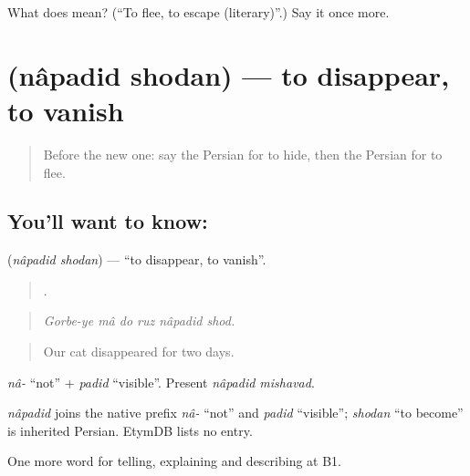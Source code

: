 \begin{tcolorbox}[breakable,colback=teal!4,colframe=teal!35!black,title={Before you move on}]
What does  mean? (\textquotedblleft{}To flee, to escape (literary)\textquotedblright{}.) Say it once more.
\end{tcolorbox}
\section[\texorpdfstring{\fa{ناپدید} \fa{شدن} (nâpadid shodan)}{ناپدید شدن (nâpadid shodan)}]{  (nâpadid shodan) — to disappear, to vanish}

\label{lesson:FA-C317-napadid-shodan}



\begin{quote}
Before the new one: say the Persian for to hide, then the Persian for to flee.
\end{quote}

\subsection*{You'll want to know:  }
\textbf{ } (\emph{nâpadid shodan}) — \textquotedblleft{}to disappear, to vanish\textquotedblright{}.

\begin{quote}
     .
\end{quote}

\begin{quote}
\emph{Gorbe-ye mâ do ruz nâpadid shod.}
\end{quote}

\begin{quote}
Our cat disappeared for two days.
\end{quote}

\emph{nâ-} \textquotedblleft{}not\textquotedblright{} + \emph{padid} \textquotedblleft{}visible\textquotedblright{}. Present \emph{nâpadid mishavad}.

\begin{cousinweb}
\emph{nâpadid} joins the native prefix \emph{nâ-} \textquotedblleft{}not\textquotedblright{} and \emph{padid} \textquotedblleft{}visible\textquotedblright{}; \emph{shodan} \textquotedblleft{}to become\textquotedblright{} is inherited Persian. EtymDB lists no entry.
\end{cousinweb}

\begin{grammarlens}[title={What you've built}]
One more word for telling, explaining and describing at B1.
\end{grammarlens}

